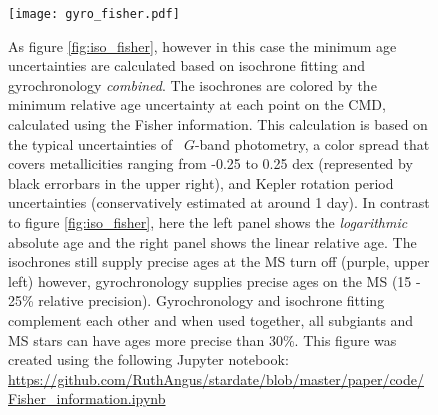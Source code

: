\begin{figure}
  \caption{
    As figure \ref{fig:iso_fisher}, however in this case the minimum age
    uncertainties are calculated based on isochrone fitting and gyrochronology
    {\it combined}.
    The isochrones are colored by the minimum relative age uncertainty at each
    point on the CMD, calculated using the Fisher information.
    This calculation is based on the typical uncertainties of
    \Gaia\ $G$-band photometry, a color spread that covers metallicities
    ranging from -0.25 to 0.25 dex (represented by black errorbars in the
    upper right), and Kepler rotation period uncertainties (conservatively
    estimated at around 1 day).
    In contrast to figure \ref{fig:iso_fisher}, here the left panel shows the
    {\it logarithmic} absolute age and the right panel shows the linear
    relative age.
    The isochrones still supply precise ages at the MS turn off (purple, upper
    left) however, gyrochronology supplies precise ages on the MS (15 - 25\%
    relative precision).
    Gyrochronology and isochrone fitting complement each other and when used
    together, all subgiants and MS stars can have ages more precise than 30\%.
    This figure was created using the following Jupyter notebook:
    \url{https://github.com/RuthAngus/stardate/blob/master/paper/code/Fisher_information.ipynb}
    \label{fig:fischer_gyro}
}
  \centering
    \texttt{[image: gyro\_fisher.pdf]}
\label{fig:gyro_fisher}
\end{figure}
